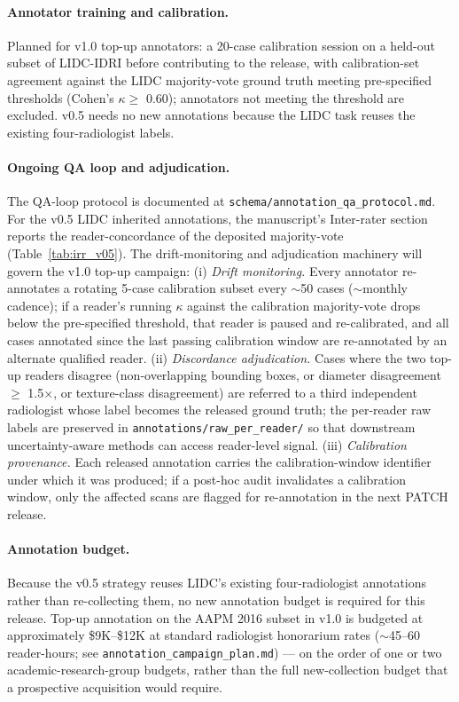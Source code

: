 \documentclass[twoside,11pt]{article}
\begin{document}
\paragraph{Annotator training and calibration.} Planned for v1.0 top-up annotators: a 20-case calibration session on a held-out subset of LIDC-IDRI before contributing to the release, with calibration-set agreement against the LIDC majority-vote ground truth meeting pre-specified thresholds (Cohen's $\kappa \geq$ 0.60); annotators not meeting the threshold are excluded. v0.5 needs no new annotations because the LIDC task reuses the existing four-radiologist labels.

\paragraph{Ongoing QA loop and adjudication.} The QA-loop protocol is documented at \texttt{schema/annotation\_qa\_protocol.md}. For the v0.5 LIDC inherited annotations, the manuscript's Inter-rater section reports the reader-concordance of the deposited majority-vote (Table~\ref{tab:irr_v05}). The drift-monitoring and adjudication machinery will govern the v1.0 top-up campaign: (i) \textit{Drift monitoring.} Every annotator re-annotates a rotating 5-case calibration subset every $\sim$50 cases ($\sim$monthly cadence); if a reader's running $\kappa$ against the calibration majority-vote drops below the pre-specified threshold, that reader is paused and re-calibrated, and all cases annotated since the last passing calibration window are re-annotated by an alternate qualified reader. (ii) \textit{Discordance adjudication.} Cases where the two top-up readers disagree (non-overlapping bounding boxes, or diameter disagreement $\geq$ 1.5$\times$, or texture-class disagreement) are referred to a third independent radiologist whose label becomes the released ground truth; the per-reader raw labels are preserved in \texttt{annotations/raw\_per\_reader/} so that downstream uncertainty-aware methods can access reader-level signal. (iii) \textit{Calibration provenance.} Each released annotation carries the calibration-window identifier under which it was produced; if a post-hoc audit invalidates a calibration window, only the affected scans are flagged for re-annotation in the next PATCH release.

\paragraph{Annotation budget.} Because the v0.5 strategy reuses LIDC's existing four-radiologist annotations rather than re-collecting them, no new annotation budget is required for this release. Top-up annotation on the AAPM 2016 subset in v1.0 is budgeted at approximately \$9K--\$12K at standard radiologist honorarium rates ($\sim$45--60 reader-hours; see \texttt{annotation\_campaign\_plan.md}) --- on the order of one or two academic-research-group budgets, rather than the full new-collection budget that a prospective acquisition would require.
\end{document}
